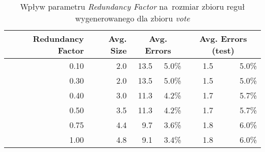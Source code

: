 \begin{table}
\begin{tabular}{|r|r|rr|rr|}
\hline
 Redundancy Factor & 
 Avg. Size & 
 \multicolumn{2}{|c|}{Avg. Errors} & 
 \multicolumn{2}{|c|}{Avg. Errors (test)} \\
\hline\hline
      0.10 &    2.0 &    13.5 & 5.0\% &    1.5 &  5.0\% \\
      0.30 &    2.0 &    13.5 & 5.0\% &    1.5 &  5.0\% \\
      0.40 &    3.0 &    11.3 & 4.2\% &    1.7 &  5.7\% \\
      0.50 &    3.5 &    11.3 & 4.2\% &    1.7 &  5.7\% \\
      0.75 &    4.4 &     9.7 & 3.6\% &    1.8 &  6.0\% \\
      1.00 &    4.8 &     9.1 & 3.4\% &    1.8 &  6.0\% \\
\hline
\end{tabular}
\caption{Wpływ parametru \emph{Redundancy Factor} na~rozmiar zbioru reguł wygenerowanego dla zbioru \emph{vote}}
\label{p2t2-vote-redundancy-factor}
\end{table}
